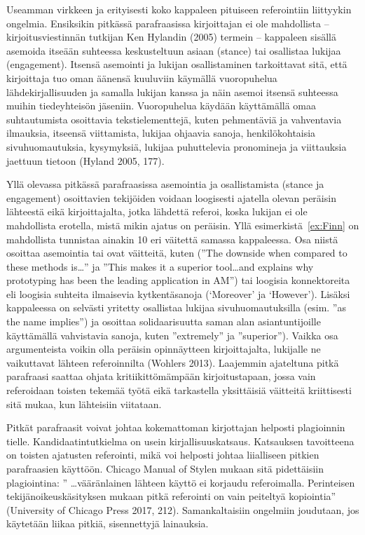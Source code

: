 \documentclass[finnish, 12pt, a4paper, arts, utf8, a-2b, online]{aaltothesis}
\begin{document}
Useamman virkkeen ja erityisesti koko kappaleen pituiseen referointiin 
liittyykin ongelmia. Ensiksikin pitkässä parafraasissa kirjoittajan ei ole 
mahdollista – kirjoitusviestinnän tutkijan Ken Hylandin (2005) termein – 
kappaleen sisällä asemoida itseään suhteessa keskusteltuun asiaan (stance) tai 
osallistaa lukijaa (engagement). Itsensä asemointi ja lukijan osallistaminen 
tarkoittavat sitä, että kirjoittaja tuo oman äänensä kuuluviin käymällä 
vuoropuhelua lähdekirjallisuuden ja samalla lukijan kanssa ja näin asemoi 
itsensä suhteessa muihin tiedeyhteisön jäseniin. Vuoropuhelua käydään 
käyttämällä omaa suhtautumista osoittavia tekstielementtejä, kuten pehmentäviä 
ja vahventavia ilmauksia, itseensä viittamista, lukijaa ohjaavia sanoja, 
henkilökohtaisia sivuhuomautuksia, kysymyksiä, lukijaa puhuttelevia pronomineja 
ja viittauksia jaettuun tietoon (Hyland 2005, 177).

Yllä olevassa pitkässä parafraasissa asemointia ja osallistamista (stance ja 
engagement) osoittavien tekijöiden voidaan loogisesti ajatella olevan peräisin 
lähteestä eikä kirjoittajalta, jotka lähdettä referoi, koska lukijan ei ole 
mahdollista erotella, mistä mikin ajatus on peräisin. Yllä 
esimerkistä~\ref{ex:Finn} on mahdollista tunnistaa ainakin 10 eri väitettä 
samassa kappaleessa. Osa niistä osoittaa asemointia tai ovat väitteitä, kuten 
(”The downside when compared to these methods is\ldots” ja ”This makes it a 
superior tool\ldots{}and explains why prototyping has been the leading 
application in AM”) tai loogisia konnektoreita eli loogisia suhteita ilmaisevia 
kytkentäsanoja (‘Moreover’ ja ‘However’). Lisäksi kappaleessa on selvästi 
yritetty osallistaa lukijaa sivuhuomautuksilla (esim. ”as the name implies”) ja 
osoittaa solidaarisuutta saman alan asiantuntijoille käyttämällä vahvistavia 
sanoja, kuten ”extremely” ja ”superior”). Vaikka osa argumenteista voikin olla 
peräisin opinnäytteen kirjoittajalta, lukijalle ne vaikuttavat lähteen 
referoinnilta (Wohlers 2013). Laajemmin ajateltuna pitkä parafraasi saattaa 
ohjata kritiikittömämpään kirjoitustapaan, jossa vain referoidaan toisten 
tekemää työtä eikä tarkastella yksittäisiä väitteitä kriittisesti sitä mukaa, 
kun lähteisiin viitataan.

Pitkät parafraasit voivat johtaa kokemattoman kirjottajan helposti plagioinnin 
tielle. Kandidaatintutkielma on usein kirjallisuuskatsaus. Katsauksen 
tavoitteena on toisten ajatusten referointi, mikä voi helposti johtaa 
liialliseen pitkien parafraasien käyttöön. Chicago Manual of Stylen mukaan sitä 
pidettäisiin plagiointina: ” \ldots vääränlainen lähteen käyttö ei korjaudu referoimalla. Perinteisen tekijänoikeuskäsityksen mukaan pitkä referointi on vain peiteltyä kopiointia” (University of Chicago Press 2017, 212). Samankaltaisiin ongelmiin joudutaan, jos käytetään liikaa pitkiä, sisennettyjä lainauksia.
\end{document}
